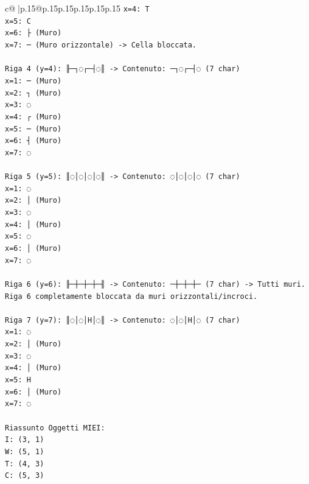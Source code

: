\documentclass{article}
\begin{document}
{\begin{supertabular}{c@{$\;$}|p{.15\linewidth}@{}p{.15\linewidth}p{.15\linewidth}p{.15\linewidth}p{.15\linewidth}p{.15\linewidth}}
{{{\texttt{x=4: T} \\
\texttt{x=5: C} \\
\texttt{x=6: ├ (Muro)} \\
\texttt{x=7: ─ (Muro orizzontale) {-}> Cella bloccata.} \\
\\ 
\texttt{Riga 4 (y=4): ╟─┐◌┌─┤◌║ {-}> Contenuto: ─┐◌┌─┤◌ (7 char)} \\
\texttt{x=1: ─ (Muro)} \\
\texttt{x=2: ┐ (Muro)} \\
\texttt{x=3: ◌} \\
\texttt{x=4: ┌ (Muro)} \\
\texttt{x=5: ─ (Muro)} \\
\texttt{x=6: ┤ (Muro)} \\
\texttt{x=7: ◌} \\
\\ 
\texttt{Riga 5 (y=5): ║◌│◌│◌│◌║ {-}> Contenuto: ◌│◌│◌│◌ (7 char)} \\
\texttt{x=1: ◌} \\
\texttt{x=2: │ (Muro)} \\
\texttt{x=3: ◌} \\
\texttt{x=4: │ (Muro)} \\
\texttt{x=5: ◌} \\
\texttt{x=6: │ (Muro)} \\
\texttt{x=7: ◌} \\
\\ 
\texttt{Riga 6 (y=6): ╟─┼─┼─┼─╢ {-}> Contenuto: ─┼─┼─┼─ (7 char) {-}> Tutti muri. Riga 6 completamente bloccata da muri orizzontali/incroci.} \\
\\ 
\texttt{Riga 7 (y=7): ║◌│◌│H│◌║ {-}> Contenuto: ◌│◌│H│◌ (7 char)} \\
\texttt{x=1: ◌} \\
\texttt{x=2: │ (Muro)} \\
\texttt{x=3: ◌} \\
\texttt{x=4: │ (Muro)} \\
\texttt{x=5: H} \\
\texttt{x=6: │ (Muro)} \\
\texttt{x=7: ◌} \\
\\ 
\texttt{Riassunto Oggetti MIEI:} \\
\texttt{I: (3, 1)} \\
\texttt{W: (5, 1)} \\
\texttt{T: (4, 3)} \\
\texttt{C: (5, 3)} \\
}}}
\end{supertabular}}
\end{document}
